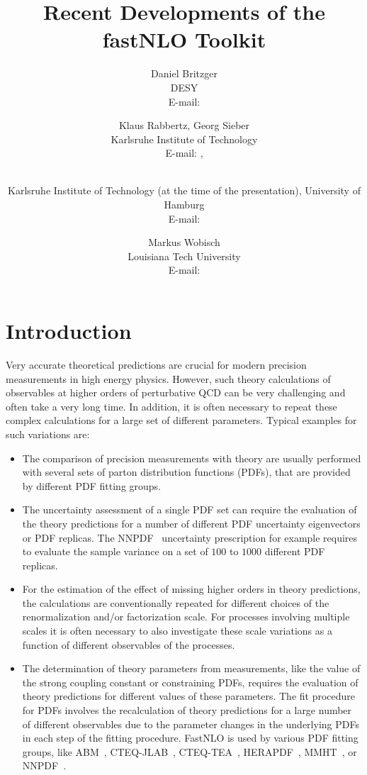 \documentclass{PoS}
\title{Recent Developments of the fastNLO Toolkit}
\author{Daniel Britzger\\
        DESY\\
        E-mail: \email{daniel.britzger@desy.de}}
\author{Klaus Rabbertz, Georg Sieber\\
        Karlsruhe Institute of Technology\\
        E-mail: \email{klaus.rabbertz@cern.ch}, \email{georg.sieber@cern.ch}}
\author{\speaker{Fred Stober}\\
        Karlsruhe Institute of Technology (at the time of the presentation), University of Hamburg\\
        E-mail: \email{stober@cern.ch}}
\author{Markus Wobisch\\
        Louisiana Tech University\\
        E-mail: \email{wobisch@fnal.gov}}
\begin{document}
\section{Introduction}

Very accurate theoretical predictions are crucial for modern
precision measurements in high energy physics.
However, such theory calculations of observables at higher orders
of perturbative QCD can be very challenging and often take a very long
time. In addition, it is often necessary to repeat these complex
calculations for a large set of different parameters. Typical examples for such variations are:

\begin{itemize}
\item The comparison of precision measurements with theory are usually
  performed with several sets of parton distribution functions (PDFs),
  that are provided by different PDF fitting groups. %
\item The uncertainty assessment of a single PDF set can require
  the evaluation of the theory predictions for a number of different
  PDF uncertainty eigenvectors or PDF replicas. The NNPDF~\cite{Ball:2014uwa} uncertainty
  prescription for example requires to evaluate the sample variance on a set of
  $100$ to $1000$ different PDF replicas.
\item For the estimation of the effect of missing higher orders in theory
  predictions, the calculations are conventionally repeated for different
  choices of the renormalization and/or factorization scale. For processes
  involving multiple scales it is often necessary to also
  investigate these scale variations as a function of different observables of
  the processes.
\item The determination of theory parameters from measurements, like
  the value of the strong coupling constant or constraining PDFs,
  requires the evaluation of theory predictions for different values
  of these parameters.
  The fit procedure for PDFs involves the recalculation
  of theory predictions for a large number of different observables due to
  the parameter changes in the underlying PDFs in each step of the fitting procedure.
  FastNLO is used by various PDF fitting groups,
  like ABM~\cite{Alekhin:2013nda}, CTEQ-JLAB~\cite{Owens:2012bv},
  CTEQ-TEA~\cite{Dulat:2015mca}, HERAPDF~\cite{Abramowicz:2015mha},
  MMHT~\cite{Harland-Lang:2014zoa}, or NNPDF~\cite{Ball:2014uwa}.
\end{itemize}
\end{document}
